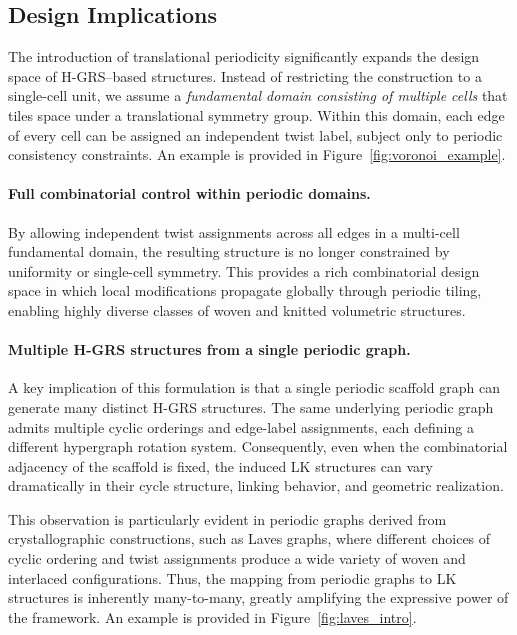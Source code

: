 \documentclass[acmtog,anonymous,review]{acmart}
\begin{document}
\subsection{Design Implications}

The introduction of translational periodicity significantly expands the design space of H-GRS–based structures. Instead of restricting the construction to a single-cell unit, we assume a \emph{fundamental domain consisting of multiple cells} that tiles space under a translational symmetry group. Within this domain, each edge of every cell can be assigned an independent twist label, subject only to periodic consistency constraints. An example is provided in Figure~\ref{fig:voronoi_example}.

\paragraph{Full combinatorial control within periodic domains.}
By allowing independent twist assignments across all edges in a multi-cell fundamental domain, the resulting structure is no longer constrained by uniformity or single-cell symmetry. This provides a rich combinatorial design space in which local modifications propagate globally through periodic tiling, enabling highly diverse classes of woven and knitted volumetric structures.

\paragraph{Multiple H-GRS structures from a single periodic graph.}
A key implication of this formulation is that a single periodic scaffold graph can generate many distinct H-GRS structures. The same underlying periodic graph admits multiple cyclic orderings and edge-label assignments, each defining a different hypergraph rotation system. Consequently, even when the combinatorial adjacency of the scaffold is fixed, the induced LK structures can vary dramatically in their cycle structure, linking behavior, and geometric realization.

This observation is particularly evident in periodic graphs derived from crystallographic constructions, such as Laves graphs, where different choices of cyclic ordering and twist assignments produce a wide variety of woven and interlaced configurations.
Thus, the mapping from periodic graphs to LK structures is inherently many-to-many, greatly amplifying the expressive power of the framework. An example is provided in Figure~\ref{fig:laves_intro}.
\end{document}
